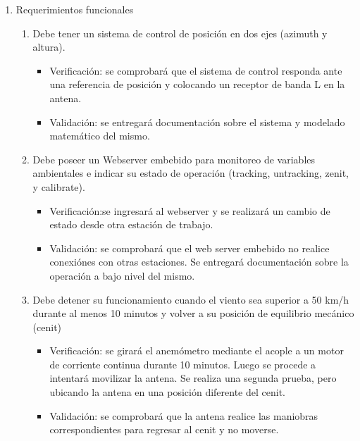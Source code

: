 \documentclass[11pt, %
codirector, %
]{charter}
\begin{document}
\begin{enumerate}
\item Requerimientos funcionales 
	\begin{enumerate}
		\item Debe tener un sistema de control de posición en dos ejes (azimuth y altura).
				\begin{itemize}
					\item Verificación: se comprobará que el sistema de control responda ante una referencia de posición y colocando un receptor de banda L en la antena. 
					\item Validación: se entregará documentación sobre el sistema y modelado matemático del mismo. 
				\end{itemize} 
		
		\item Debe poseer un Webserver embebido para monitoreo de variables ambientales e indicar su estado de operación (tracking, untracking, zenit, y calibrate). 
			\begin{itemize}
				\item Verificación:se ingresará al webserver y se realizará un cambio de estado desde otra estación de trabajo. 
				\item Validación: se comprobará que el web server embebido no realice conexiónes con otras estaciones. Se entregará documentación sobre la operación a bajo nivel del mismo.  
			\end{itemize} 
		\setcounter{enumii}{4}	
		\item Debe detener su funcionamiento cuando el viento sea superior a 50 km/h durante al menos 10 minutos y volver a su posición de equilibrio mecánico (cenit) 
			\begin{itemize}
				\item Verificación: se girará el anemómetro mediante el acople a un motor de corriente continua durante 10 minutos. Luego se procede a intentará movilizar la antena. Se realiza una segunda prueba, pero ubicando la antena en una posición diferente del cenit. 
				\item Validación: se comprobará que la antena realice las maniobras correspondientes para regresar al cenit y no moverse. 
			\end{itemize} 

\end{enumerate}
\end{enumerate}
\end{document}
